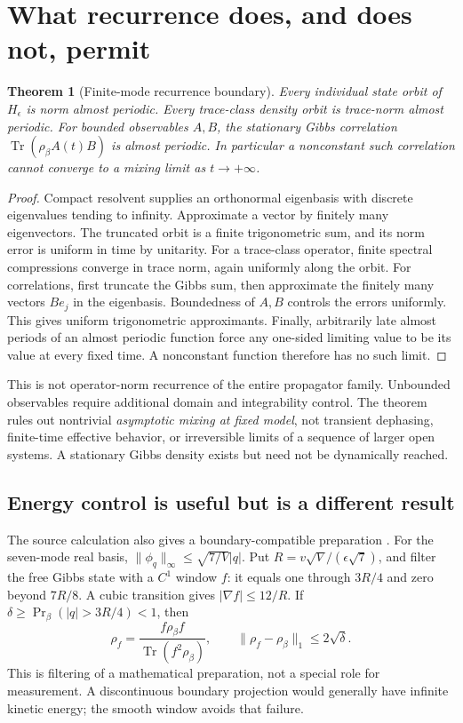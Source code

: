 \documentclass[11pt]{article}
\newtheorem{theorem}{Theorem}[section]
\newcommand{\Tr}{\operatorname{Tr}}
\begin{document}
\section{What recurrence does, and does not, permit}
\begin{theorem}[Finite-mode recurrence boundary]\label{thm:recurrence}
Every individual state orbit of $H_\epsilon$ is norm almost periodic.
Every trace-class density orbit is trace-norm almost periodic. For bounded
observables $A,B$, the stationary Gibbs correlation
$\Tr(\rho_\beta A(t)B)$ is almost periodic. In particular a nonconstant
such correlation cannot converge to a mixing limit as $t\to+\infty$.
\end{theorem}
\begin{proof}
Compact resolvent supplies an orthonormal eigenbasis with discrete
eigenvalues tending to infinity. Approximate a vector by finitely many
eigenvectors. The truncated orbit is a finite trigonometric sum, and its
norm error is uniform in time by unitarity. For a trace-class operator,
finite spectral compressions converge in trace norm, again uniformly along
the orbit. For correlations, first truncate the Gibbs sum, then approximate
the finitely many vectors $B e_j$ in the eigenbasis. Boundedness of $A,B$
controls the errors uniformly. This gives uniform trigonometric
approximants. Finally, arbitrarily late almost periods of an almost
periodic function force any one-sided limiting value to be its value at
every fixed time. A nonconstant function therefore has no such limit.
\end{proof}

This is not operator-norm recurrence of the entire propagator family.
Unbounded observables require additional domain and integrability control.
The theorem rules out nontrivial \emph{asymptotic mixing at fixed model},
not transient dephasing, finite-time effective behavior, or irreversible
limits of a sequence of larger open systems. A stationary Gibbs density
exists but need not be dynamically reached.

\subsection{Energy control is useful but is a different result}
The source calculation also gives a boundary-compatible preparation
\cite{WC}. For the seven-mode real basis,
$\|\phi_q\|_\infty\le\sqrt{7/V}|q|$. Put
$R=v\sqrt{V}/(\epsilon\sqrt7)$, and filter the free Gibbs state with a
$C^1$ window $f$: it equals one through $3R/4$ and zero beyond $7R/8$.
A cubic transition gives $|\nabla f|\le12/R$. If
$\delta\ge\Pr_\beta(|q|>3R/4)<1$, then
\begin{equation}
 \rho_f=\frac{f\rho_\beta f}{\Tr(f^2\rho_\beta)},\qquad
 \|\rho_f-\rho_\beta\|_1\le2\sqrt{\delta}.
\end{equation}
This is filtering of a mathematical preparation, not a special role for
measurement. A discontinuous boundary projection would generally have
infinite kinetic energy; the smooth window avoids that failure.
\end{document}
